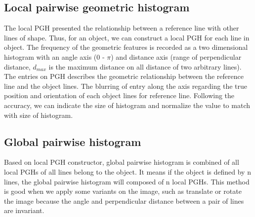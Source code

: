 \subsection{Local pairwise geometric histogram}
The local PGH presented the relationship between a reference line with other lines of shape. Thus, for an object, we can construct a local PGH for each line in object. The frequency of the geometric features is recorded as a two dimensional histogram with an angle axis (0 - $\pi$) and distance axis (range of perpendicular distance, $d_{max}$ is the maximum distance on all distance of two arbitrary lines). The entries on PGH describes the geometric relationship between the reference line and the object lines. The blurring of entry along the axis regarding the true position and orientation of each object lines for reference line. Following the accuracy, we can indicate the size of histogram and normalize the value to match with size of histogram.
\subsection{Global pairwise histogram}
Based on local PGH constructor, global pairwise histogram is combined of all local PGHs of all lines belong to the object. It means if the object is defined by n lines, the global pairwise histogram will composed of n local PGHs. This method is good when we apply some variants on the image, such as translate or rotate the image because the angle and perpendicular distance between a pair of lines are invariant.
